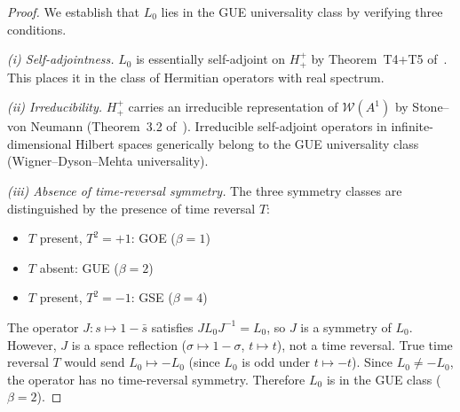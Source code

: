 \documentclass[12pt,a4paper]{article}
\newcommand{\Hplusplus}{H^+_+}
\newcommand{\WA}{\mathcal{W}(A^1)}
\begin{document}
\begin{proof}
We establish that $L_0$ lies in the GUE universality class by verifying
three conditions.

\emph{(i) Self-adjointness.}
$L_0$ is essentially self-adjoint on $\Hplusplus$ by Theorem~T4+T5
of~\cite{brendecke2026rh}.
This places it in the class of Hermitian operators with real spectrum.

\emph{(ii) Irreducibility.}
$\Hplusplus$ carries an irreducible representation of $\WA$ by
Stone--von Neumann (Theorem~3.2 of~\cite{brendecke2026rh}).
Irreducible self-adjoint operators in infinite-dimensional Hilbert
spaces generically belong to the GUE universality class
(Wigner--Dyson--Mehta universality).

\emph{(iii) Absence of time-reversal symmetry.}
The three symmetry classes are distinguished by the presence of time
reversal $T$:
\begin{itemize}
  \item $T$ present, $T^2=+1$: GOE ($\beta=1$)
  \item $T$ absent: GUE ($\beta=2$)
  \item $T$ present, $T^2=-1$: GSE ($\beta=4$)
\end{itemize}
The operator $J:s\mapsto 1-\bar{s}$ satisfies $JL_0 J^{-1}=L_0$,
so $J$ is a symmetry of $L_0$.
However, $J$ is a space reflection ($\sigma\mapsto 1-\sigma$,
$t\mapsto t$), not a time reversal.
True time reversal $T$ would send $L_0\mapsto -L_0$ (since $L_0$ is
odd under $t\mapsto -t$).
Since $L_0\neq -L_0$, the operator has no time-reversal symmetry.
Therefore $L_0$ is in the GUE class ($\beta=2$).
\end{proof}
\end{document}
